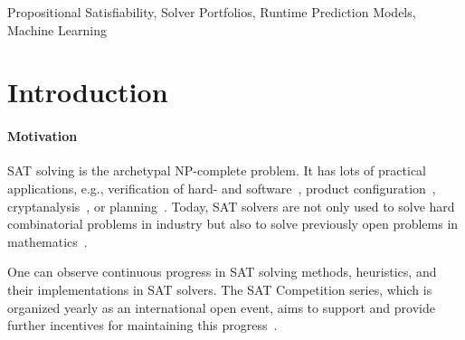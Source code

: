 \documentclass[conference]{IEEEtran}
\begin{document}
\begin{IEEEkeywords}
Propositional Satisfiability, Solver Portfolios, Runtime Prediction Models, Machine Learning
\end{IEEEkeywords}

\section{Introduction}
\label{sec:introduction}

\paragraph{Motivation}

SAT solving is the archetypal NP-complete problem. It has lots of practical applications, e.g., verification of hard- and software~\cite{Kaufmann:2021:Amulet,Buning:2020:QPRVerify}, product configuration~\cite{Janota:2014:Configuration}, cryptanalysis~\cite{Nejati:2020:CDCLCrypto}, or planning~\cite{Schreiber:2021:Lilotane}. 
Today, SAT solvers are not only used to solve hard combinatorial problems in industry but also to solve previously open problems in mathematics~\cite{Heule:2016:Pyth,Heule:2018:Schur}. 

One can observe continuous progress in SAT solving methods, heuristics, and their implementations in SAT solvers. 
The SAT Competition series, which is organized yearly as an international open event, aims to support and provide further incentives for maintaining this progress~\cite{balyo2020proceedings}. %
\end{document}
